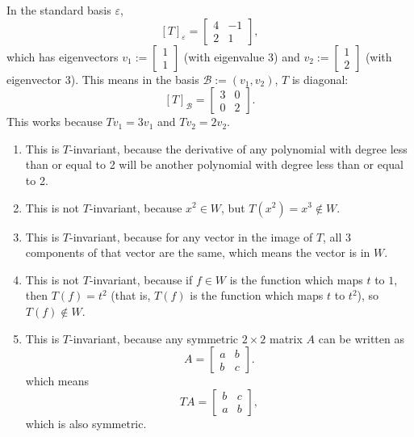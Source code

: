 \documentclass{article}
\begin{document}
\bigskip
\par
\begin{prob}
\end{prob}
In the standard basis $\varepsilon$,
\[ [T]_\varepsilon = \begin{bmatrix}
    4 & -1 \\
    2 & 1
\end{bmatrix}, \]
which has eigenvectors $ v_1 := \begin{bmatrix}
    1 \\
    1
\end{bmatrix}$ (with eigenvalue 3) and $ v_2 := \begin{bmatrix}
    1 \\
    2
\end{bmatrix}$ (with eigenvector 3). This means in the basis $\mathcal{B} := (v_1, v_2)$, $T$ is diagonal:
\[ [T]_\mathcal{B} = \begin{bmatrix}
    3 & 0 \\
    0 & 2
\end{bmatrix}. \]
This works because $Tv_1=3v_1$ and $Tv_2=2v_2$.

\bigskip
\par
\begin{prob}
\end{prob}
\begin{enumerate}[label=(\alph*)]
    \item This is $T$-invariant, because the derivative of any polynomial with degree less than or equal to 2 will be another polynomial with degree less than or equal to 2.
    \item This is not $T$-invariant, because $x^2 \in W$, but $T(x^2)=x^3 \not\in W$.
    \item This is $T$-invariant, because for any vector in the image of $T$, all 3 components of that vector are the same, which means the vector is in $W$.
    \item This is not $T$-invariant, because if $f\in W$ is the function which maps $t$ to $1$, then $T(f)=t^2$ (that is, $T(f)$ is the function which maps $t$ to $t^2$), so $T(f) \not\in W$.
    \item This is $T$-invariant, because any symmetric $2 \times 2$ matrix $A$ can be written as
        \[ A = \begin{bmatrix}
            a & b \\
            b & c
        \end{bmatrix}. \]
        which means
        \[ TA = \begin{bmatrix}
            b & c \\
            a & b
        \end{bmatrix}, \]
        which is also symmetric.
\end{enumerate}



\end{document}
